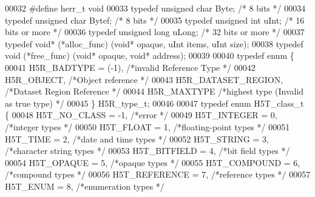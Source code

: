 \begin{DoxyCode}
00032 \textcolor{preprocessor}{#define herr\_t void}
00033 \textcolor{keyword}{typedef} \textcolor{keywordtype}{unsigned} \textcolor{keywordtype}{char}  Byte;  \textcolor{comment}{/* 8 bits */}
00034 \textcolor{keyword}{typedef} \textcolor{keywordtype}{unsigned} \textcolor{keywordtype}{char}  Bytef; \textcolor{comment}{/* 8 bits */}
00035 \textcolor{keyword}{typedef} \textcolor{keywordtype}{unsigned} \textcolor{keywordtype}{int}   uInt;  \textcolor{comment}{/* 16 bits or more */}
00036 \textcolor{keyword}{typedef} \textcolor{keywordtype}{unsigned} \textcolor{keywordtype}{long}  uLong; \textcolor{comment}{/* 32 bits or more */}
00037 \textcolor{keyword}{typedef} \textcolor{keywordtype}{void}* (*alloc\_func) (\textcolor{keywordtype}{void}* opaque, uInt items, uInt size);
00038 \textcolor{keyword}{typedef} void   (*free\_func) (\textcolor{keywordtype}{void}* opaque, \textcolor{keywordtype}{void}* address);
00039 
00040 \textcolor{keyword}{typedef} \textcolor{keyword}{enum} \{
00041     H5R\_BADTYPE     =   (-1),   \textcolor{comment}{/*invalid Reference Type                     */}
00042     H5R\_OBJECT,                 \textcolor{comment}{/*Object reference                           */}
00043     H5R\_DATASET\_REGION,         \textcolor{comment}{/*Dataset Region Reference                   */}
00044     H5R\_MAXTYPE                 \textcolor{comment}{/*highest type (Invalid as true type)        */}
00045 \} H5R\_type\_t;
00046 
00047 \textcolor{keyword}{typedef} \textcolor{keyword}{enum} H5T\_class\_t \{
00048     H5T\_NO\_CLASS         = -1,  \textcolor{comment}{/*error                                      */}
00049     H5T\_INTEGER          = 0,   \textcolor{comment}{/*integer types                              */}
00050     H5T\_FLOAT            = 1,   \textcolor{comment}{/*floating-point types                       */}
00051     H5T\_TIME             = 2,   \textcolor{comment}{/*date and time types                        */}
00052     H5T\_STRING           = 3,   \textcolor{comment}{/*character string types                     */}
00053     H5T\_BITFIELD         = 4,   \textcolor{comment}{/*bit field types                            */}
00054     H5T\_OPAQUE           = 5,   \textcolor{comment}{/*opaque types                               */}
00055     H5T\_COMPOUND         = 6,   \textcolor{comment}{/*compound types                             */}
00056     H5T\_REFERENCE        = 7,   \textcolor{comment}{/*reference types                            */}
00057     H5T\_ENUM             = 8,   \textcolor{comment}{/*enumeration types                          */}

\end{DoxyCode}

